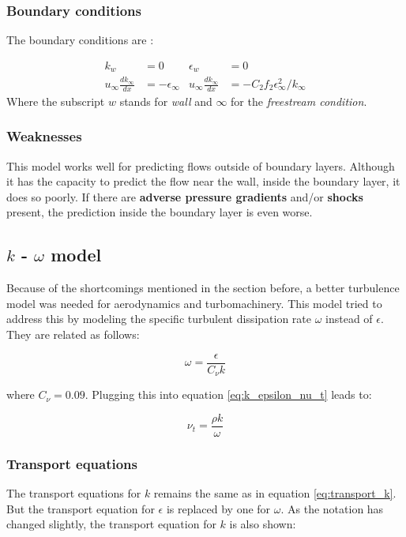 \subsubsection{Boundary conditions}
The boundary conditions are \cite{JONES1972301}:

\begin{align*}
    k_{w}        &= 0       &\epsilon_{w} &= 0 \\
    u_{\infty} \frac{d k_{\infty}}{d x}  &= - \epsilon_{\infty}
    & u_{\infty} \frac{d k_{\infty}}{d x} &= 
    - C_2 f_2 \epsilon_{\infty}^2 / k_{\infty}
\end{align*}
\noindent Where the subscript $w$ stands for \textit{wall} and $\infty$ for the
\textit{freestream condition}.


\subsubsection{Weaknesses}
This model works well for predicting flows outside of boundary layers. Although
it has the capacity to predict the flow near the wall, inside the boundary
layer, it does so poorly. If there are \textbf{adverse pressure gradients}
and/or \textbf{shocks} present, the prediction inside the boundary layer is
even worse. \cite{cfd101_k-epsilon}




\subsection{$k$ - $\omega$ model}
Because of the shortcomings mentioned in the section before, a better
turbulence model was needed for aerodynamics and turbomachinery. This model
tried to address this by modeling the specific turbulent dissipation rate
$\omega$ instead of $\epsilon$. They are related as follows:

\begin{equation}
    \label{eq:omega_epsilon}
    \omega = \frac{\epsilon}{C_{\nu} k}
\end{equation}

\noindent where $C_{\nu} = 0.09$. Plugging this into equation
\ref{eq:k_epsilon_nu_t} leads to:

\begin{equation}
    \nu_t = \frac{\rho k}{\omega}
\end{equation}


\subsubsection{Transport equations}
The transport equations for $k$ remains the same as in equation
\ref{eq:transport_k}. But the transport equation for $\epsilon$ is replaced by
one for $\omega$. As the notation has changed slightly, the transport equation
for $k$ is also shown:

